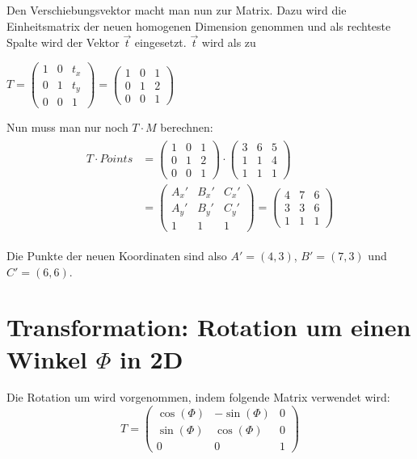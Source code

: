 Den Verschiebungsvektor macht man nun zur Matrix. Dazu wird die Einheitsmatrix der neuen homogenen Dimension genommen und als rechteste Spalte wird der Vektor $\vec{t}$ eingesetzt. $\vec{t}$ wird als zu 

$T=\begin{pmatrix}
1 & 0 & t_x\\
0 & 1 & t_y\\
0 & 0 & 1
\end{pmatrix}=\begin{pmatrix}
1 & 0 & 1\\
0 & 1 & 2\\
0 & 0 & 1
\end{pmatrix}$

Nun muss man nur noch $T \cdot  M$ berechnen:
\begin{align}
\begin{split}
T\cdot Points &=\begin{pmatrix}
1 & 0 & 1\\
0 & 1 & 2\\
0 & 0 & 1
\end{pmatrix} \cdot  \begin{pmatrix}
3 & 6 & 5\\
1 & 1 & 4\\
1 & 1 & 1
\end{pmatrix}\\
&= \begin{pmatrix}
A_x' & B_x' & C_x'\\
A_y' & B_y' & C_y'\\ \hline
1 & 1 & 1
\end{pmatrix} = \begin{pmatrix}
4 & 7 & 6\\
3 & 3 & 6\\ \hline
1 & 1 & 1
\end{pmatrix}
\end{split}
\end{align}

Die Punkte der neuen Koordinaten sind also $A'=(4,3)$, $B'=(7,3)$ und $C'=(6,6)$.

\section{Transformation: Rotation um einen Winkel $\Phi$ in 2D}

Die Rotation um wird vorgenommen, indem folgende Matrix verwendet wird:
\[
T = \begin{pmatrix}
\cos (\Phi) & -\sin (\Phi) & 0\\
\sin (\Phi) & \cos (\Phi) & 0\\
0 & 0 & 1
\end{pmatrix}
\]

